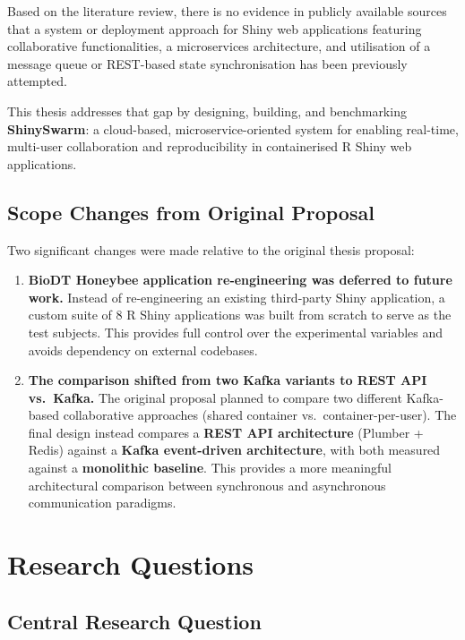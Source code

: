 \documentclass[12pt,a4paper]{article}
\begin{document}
Based on the literature review, there is no evidence in publicly available sources that a system or deployment approach for Shiny web applications featuring collaborative functionalities, a microservices architecture, and utilisation of a message queue or REST-based state synchronisation has been previously attempted.

This thesis addresses that gap by designing, building, and benchmarking \textbf{ShinySwarm}: a cloud-based, microservice-oriented system for enabling real-time, multi-user collaboration and reproducibility in containerised R Shiny web applications.

\subsection{Scope Changes from Original Proposal}

Two significant changes were made relative to the original thesis proposal:

\begin{enumerate}[nosep]
  \item \textbf{BioDT Honeybee application re-engineering was deferred to future work.} Instead of re-engineering an existing third-party Shiny application, a custom suite of 8 R Shiny applications was built from scratch to serve as the test subjects. This provides full control over the experimental variables and avoids dependency on external codebases.
  \item \textbf{The comparison shifted from two Kafka variants to REST API vs.\ Kafka.} The original proposal planned to compare two different Kafka-based collaborative approaches (shared container vs.\ container-per-user). The final design instead compares a \textbf{REST API architecture} (Plumber + Redis) against a \textbf{Kafka event-driven architecture}, with both measured against a \textbf{monolithic baseline}. This provides a more meaningful architectural comparison between synchronous and asynchronous communication paradigms.
\end{enumerate}

\section{Research Questions}

\subsection{Central Research Question}
\end{document}
